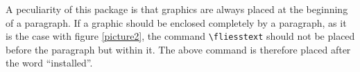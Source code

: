 A peculiarity of this package is that graphics are always placed at the beginning of a paragraph.
If a graphic should be enclosed completely by a paragraph, as it is the case with figure \ref{picture2}, the command 
\texttt{\textbackslash fliesstext} should not be placed before the paragraph but within it.
The above command is therefore placed after the word "`installed"'.
%